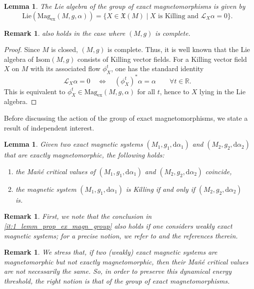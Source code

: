 \documentclass[11pt,reqno]{amsart}
\newcommand{\Lie}{\mathrm{Lie}}
\newcommand{\Isom}{\mathrm{Isom}}
\theoremstyle{plain}
\newtheorem{lem}[thm]{Lemma}
\newtheorem{rem}[thm]{Remark}
\theoremstyle{definition}
\numberwithin{equation}{section}
\def\d{\delta}
\def\d{\delta}
\def\d{{\mathrm{d}}}
\begin{document}
\begin{lem}
\label{lem: Lie algebra Mag_ex}
The Lie algebra of the group of exact magnetomorphisms is given by
\[
\Lie(\mathrm{Mag}_{\mathrm{ex}}(M,g,\alpha))
=
\{X\in\mathfrak X(M)\mid X \text{ is Killing and } \mathcal L_X\alpha=0\}.
\]
\end{lem}

\begin{rem}
     also holds in the case where $(M,g)$ is complete.
\end{rem}

\begin{proof}
Since $M$ is closed, $(M,g)$ is complete. Thus, it is well known that the Lie algebra of $\Isom(M,g)$ consists of Killing vector fields. For a Killing vector field $X$ on $M$ with its associated flow $\phi_X^t$, one has the standard identity
\[
\mathcal L_X\alpha=0
\quad\Longleftrightarrow\quad
(\phi_X^t)^*\alpha=\alpha \qquad \forall t\in\mathbb R.
\]
This is equivalent to $\phi_X^t\in \mathrm{Mag}_{\mathrm{ex}}(M,g,\alpha)$ for all $t$, hence to $X$ lying in the Lie algebra.
\end{proof}
Before discussing the action of the group of exact magnetomorphisms, we state a result of independent interest.

\begin{lem}\label{lem:properties_exact_magnetomorphisms}
    Given two exact magnetic systems $(M_1,g_1,\d\alpha_1)$ and $(M_2,g_2,\d\alpha_2)$ that are exactly magnetomorphic, the following holds:
    \begin{enumerate}[label=(\arabic*)]
        \item\label{it:1_lemm_prop_ex_magn_group} the Mañé critical values of $(M_1,g_1,\d\alpha_1)$ and $(M_2,g_2,\d\alpha_2)$ coincide,
        \item\label{it:2_lemm_prop_ex_magn_group} the magnetic system $(M_1,g_1,\d\alpha_1)$ is Killing if and only if $(M_2,g_2,\d\alpha_2)$ is.
    \end{enumerate}
\end{lem}

\begin{rem}
    First, we note that the conclusion in \ref{it:1_lemm_prop_ex_magn_group} also holds if one considers weakly exact magnetic systems; for a precise notion, we refer to \cite{CFP10} and the references therein.
\end{rem}

\begin{rem}
    We stress that, if two (weakly) exact magnetic systems are magnetomorphic but not exactly magnetomorphic, then their Mañé critical values are not necessarily the same. So, in order to preserve this dynamical energy threshold, the right notion is that of the group of exact magnetomorphisms.
\end{rem}
\end{document}
